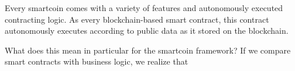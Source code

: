 
Every smartcoin comes with a variety of features and autonomously
executed contracting logic. As every blockchain-based smart contract,
this contract autonomously executes according to public data as it
stored on the blockchain.

What does this mean in particular for the smartcoin framework?
If we compare smart contracts with business logic, we realize that 


